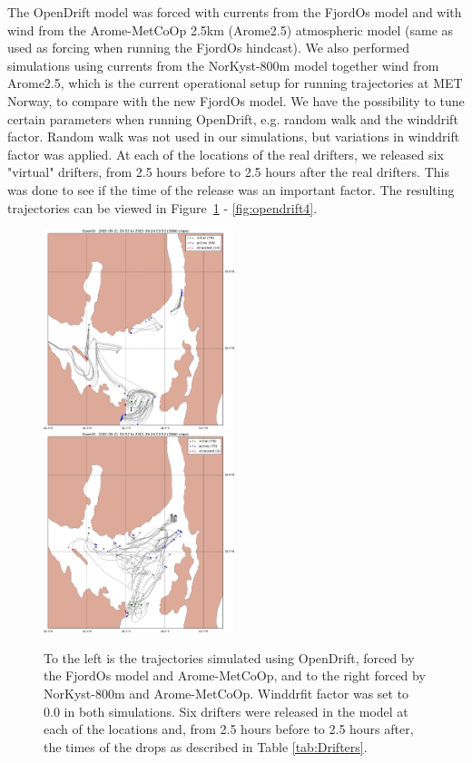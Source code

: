 \documentclass[12pt,a4paper,english]{article}
\begin{document}
The OpenDrift model was forced with currents from the FjordOs model and with wind from the Arome-MetCoOp 2.5km (Arome2.5) atmospheric model (same as used as forcing when running the FjordOs hindcast). We also performed simulations using currents from the NorKyst-800m model together wind from Arome2.5, which is the current operational setup for running trajectories at MET Norway, to compare with the new FjordOs model. We have the possibility to tune certain parameters when running OpenDrift, e.g. random walk and the winddrift factor. Random walk was not used in our simulations, but variations in winddrift factor was applied. At each of the locations of the real drifters, we released six "virtual" drifters, from 2.5 hours before to 2.5 hours after the real drifters. This was done to see if the time of the release was an important factor. The resulting trajectories can be viewed in Figure~\ref{fig:opendrift1} - \ref{fig:opendrift4}.


\begin{figure}[ht]
\centerline{
\includegraphics*[width=0.495\textwidth]{Opendrift_simulations/LTR3/tokt_drifters_winddrift_0p0_radius_0_num_6_plusminus_2p5h_crop}
\includegraphics*[width=0.495\textwidth]{Opendrift_simulations/LTR3/tokt_drifters_winddrift_0p0_radius_0_num_6_plusminus_2p5h_norkyst_crop}
}
\caption{\small
To the left is the trajectories simulated using OpenDrift, forced by the FjordOs model and Arome-MetCoOp, and to the right forced by NorKyst-800m and Arome-MetCoOp. Winddrfit factor was set to 0.0 in both simulations. Six drifters were released in the model at each of the locations and, from 2.5 hours before to 2.5 hours after, the times of the drops as described in Table \ref{tab:Drifters}.
}
\label{fig:opendrift1}
\end{figure}
\end{document}
